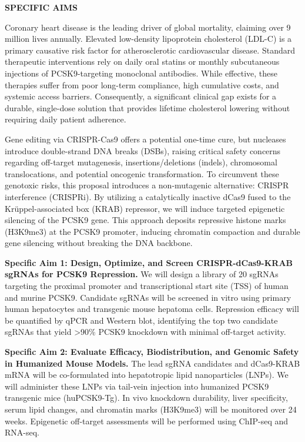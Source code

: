 \documentclass[11pt]{article}
\newcommand{\p}{\vspace{1.5mm}}
\begin{document}
\begin{aimsbox}
    \begin{center}
        {\large\bfseries\color{medteal} SPECIFIC AIMS}
    \end{center}
    \vspace{1.5mm}

    Coronary heart disease is the leading driver of global mortality, claiming over 9 million lives annually. Elevated low-density lipoprotein cholesterol (LDL-C) is a primary causative risk factor for atherosclerotic cardiovascular disease. Standard therapeutic interventions rely on daily oral statins or monthly subcutaneous injections of PCSK9-targeting monoclonal antibodies. While effective, these therapies suffer from poor long-term compliance, high cumulative costs, and systemic access barriers. Consequently, a significant clinical gap exists for a durable, single-dose solution that provides lifetime cholesterol lowering without requiring daily patient adherence.

    \p
    Gene editing via CRISPR-Cas9 offers a potential one-time cure, but nucleases introduce double-strand DNA breaks (DSBs), raising critical safety concerns regarding off-target mutagenesis, insertions/deletions (indels), chromosomal translocations, and potential oncogenic transformation. To circumvent these genotoxic risks, this proposal introduces a non-mutagenic alternative: CRISPR interference (CRISPRi). By utilizing a catalytically inactive dCas9 fused to the Krüppel-associated box (KRAB) repressor, we will induce targeted epigenetic silencing of the PCSK9 gene. This approach deposits repressive histone marks (H3K9me3) at the PCSK9 promoter, inducing chromatin compaction and durable gene silencing without breaking the DNA backbone.

    \p
    \textbf{Specific Aim 1: Design, Optimize, and Screen CRISPR-dCas9-KRAB sgRNAs for PCSK9 Repression.}
    We will design a library of 20 sgRNAs targeting the proximal promoter and transcriptional start site (TSS) of human and murine PCSK9. Candidate sgRNAs will be screened in vitro using primary human hepatocytes and transgenic mouse hepatoma cells. Repression efficacy will be quantified by qPCR and Western blot, identifying the top two candidate sgRNAs that yield >90\% PCSK9 knockdown with minimal off-target activity.

    \p
    \textbf{Specific Aim 2: Evaluate Efficacy, Biodistribution, and Genomic Safety in Humanized Mouse Models.}
    The lead sgRNA candidates and dCas9-KRAB mRNA will be co-formulated into hepatotropic lipid nanoparticles (LNPs). We will administer these LNPs via tail-vein injection into humanized PCSK9 transgenic mice (huPCSK9-Tg). In vivo knockdown durability, liver specificity, serum lipid changes, and chromatin marks (H3K9me3) will be monitored over 24 weeks. Epigenetic off-target assessments will be performed using ChIP-seq and RNA-seq.


\end{aimsbox}
\end{document}
